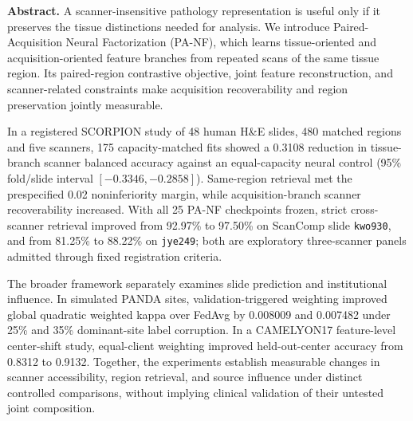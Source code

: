 \begin{center}
\begin{minipage}{0.92\linewidth}
\small
\textbf{Abstract.}
A scanner-insensitive pathology representation is useful only if it preserves the tissue distinctions needed for analysis. We introduce Paired-Acquisition Neural Factorization (PA-NF), which learns tissue-oriented and acquisition-oriented feature branches from repeated scans of the same tissue region. Its paired-region contrastive objective, joint feature reconstruction, and scanner-related constraints make acquisition recoverability and region preservation jointly measurable.

In a registered SCORPION study of 48 human H\&E slides, 480 matched regions and five scanners, 175 capacity-matched fits showed a 0.3108 reduction in tissue-branch scanner balanced accuracy against an equal-capacity neural control (95\% fold/slide interval $[-0.3346,-0.2858]$). Same-region retrieval met the prespecified 0.02 noninferiority margin, while acquisition-branch scanner recoverability increased. With all 25 PA-NF checkpoints frozen, strict cross-scanner retrieval improved from 92.97\% to 97.50\% on ScanComp slide \texttt{kwo930}, and from 81.25\% to 88.22\% on \texttt{jye249}; both are exploratory three-scanner panels admitted through fixed registration criteria.

The broader framework separately examines slide prediction and institutional influence. In simulated PANDA sites, validation-triggered weighting improved global quadratic weighted kappa over FedAvg by 0.008009 and 0.007482 under 25\% and 35\% dominant-site label corruption. In a CAMELYON17 feature-level center-shift study, equal-client weighting improved held-out-center accuracy from 0.8312 to 0.9132. Together, the experiments establish measurable changes in scanner accessibility, region retrieval, and source influence under distinct controlled comparisons, without implying clinical validation of their untested joint composition.
\end{minipage}
\end{center}
